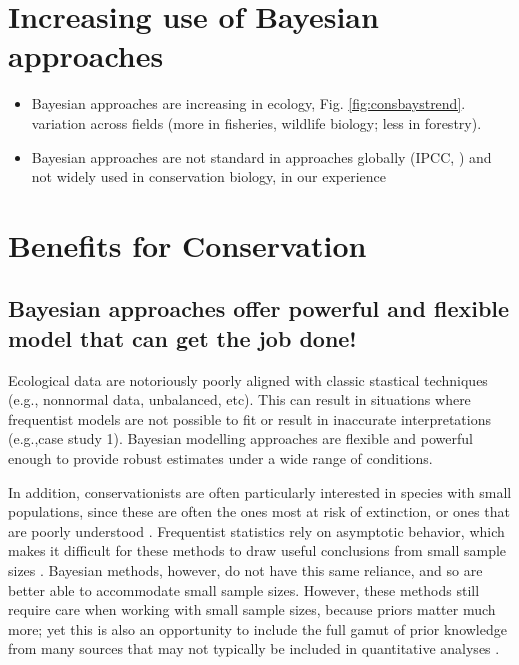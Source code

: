 \documentclass{article}
\begin{document}
\section* {Increasing use of Bayesian approaches}
\begin{itemize}
\item Bayesian approaches are increasing in ecology, Fig. \ref{fig:consbaystrend}. variation across fields (more in fisheries, wildlife biology; less in forestry).
\item Bayesian approaches are not standard in approaches globally (IPCC, ) and not widely used in conservation biology, in our experience
\end{itemize}
\section* {Benefits for Conservation}
\subsection*{Bayesian approaches offer powerful and flexible model that can get the job done!}
\par Ecological data are notoriously poorly aligned with classic stastical techniques (e.g., nonnormal data, unbalanced, etc). This can result in situations where frequentist models are not possible to fit or result in inaccurate interpretations (e.g.,case study 1). Bayesian modelling approaches are flexible and powerful enough to provide robust estimates under a wide range of conditions. 
\par In addition, conservationists are often particularly interested in species with small populations, since these are often the ones most at risk of extinction, or ones that are poorly understood \citep{stinchcombe2002influence}. Frequentist statistics rely on asymptotic behavior, which makes it difficult for these methods to draw useful conclusions from small sample sizes \citep{mcneigh2016using}. Bayesian methods, however, do not have this same reliance, and so are better able to accommodate small sample sizes. However, these methods still require care when working with small sample sizes, because priors matter much more; yet this is also an opportunity to include the full gamut of prior knowledge from many sources that may not typically be included in quantitative analyses \citep{mcneish2016using}. 
\end{document}
